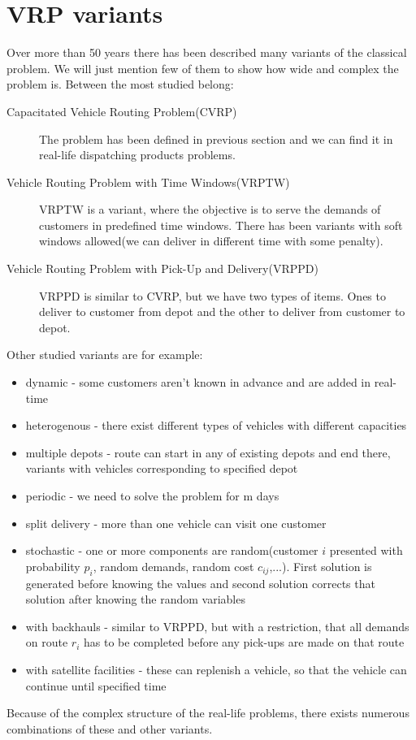 \documentclass[thesis=B,english]{FITthesis}[2012/10/20]
\begin{document}
    \section{VRP variants}
    Over more than 50 years there has been described many variants of the classical problem. We will just mention few of them to show how wide and complex the problem is.
    Between the most studied belong:
    \begin{description}
      \item[Capacitated Vehicle Routing Problem(CVRP)] \hfill \break
      The problem has been defined in previous section and we can find it in real-life dispatching products problems.
      \item[Vehicle Routing Problem with Time Windows(VRPTW)] \hfill \break
      VRPTW is a variant, where the objective is to serve the demands of customers in predefined time windows. There has been variants with soft windows allowed(we can deliver in different time with some penalty).
      \item[Vehicle Routing Problem with Pick-Up and Delivery(VRPPD)] \hfill \break
      VRPPD is similar to CVRP, but we have two types of items. Ones to deliver to customer from depot and the other to deliver from customer to depot.
    \end{description}
    Other studied variants are for example:
    \begin{itemize}[noitemsep]
      \item dynamic - some customers aren't known in advance and are added in real-time
      \item heterogenous - there exist different types of vehicles with different capacities
      \item multiple depots - route can start in any of existing depots and end there, variants with vehicles corresponding to specified depot
      \item periodic - we need to solve the problem for m days
      \item split delivery - more than one vehicle can visit one customer
      \item stochastic - one or more components are random(customer \(i\) presented with probability \(p_i\), random demands, random cost \(c_{ij}\),...). First solution is generated before knowing the values and second solution corrects that solution after knowing the random variables
      \item with backhauls - similar to VRPPD, but with a restriction, that all demands on route \(r_{i}\) has to be completed before any pick-ups are made on that route
      \item with satellite facilities - these can replenish a vehicle, so that the vehicle can continue until specified time
    \end{itemize}
    Because of the complex structure of the real-life problems, there exists numerous combinations of these and other variants.
\end{document}
